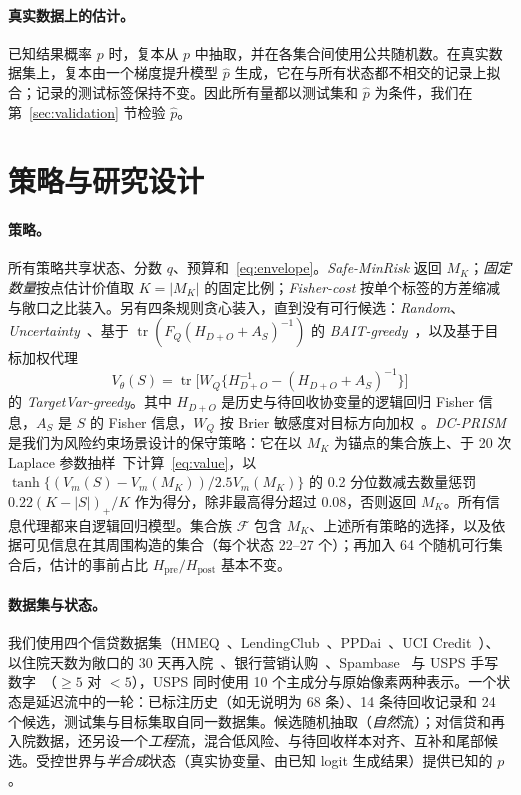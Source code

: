 \documentclass[runningheads]{llncs}
\newcommand{\Hpost}{H_{\mathrm{post}}}
\newcommand{\Hpre}{H_{\mathrm{pre}}}
\begin{document}
\paragraph{真实数据上的估计。}已知结果概率 $p$ 时，复本从 $p$ 中抽取，并在各集合间使用公共随机数。在真实数据集上，复本由一个梯度提升模型 $\hat p$ 生成，它在与所有状态都不相交的记录上拟合；记录的测试标签保持不变。因此所有量都以测试集和 $\hat p$ 为条件，我们在第~\ref{sec:validation} 节检验 $\hat p$。

\section{策略与研究设计}
\label{sec:policy}
\paragraph{策略。}所有策略共享状态、分数 $q$、预算和~\eqref{eq:envelope}。\emph{Safe-MinRisk} 返回 $M_K$；\emph{固定数量}按点估计价值取 $K=|M_K|$ 的固定比例；\emph{Fisher-cost} 按单个标签的方差缩减与敞口之比装入。另有四条规则贪心装入，直到没有可行候选：\emph{Random}、\emph{Uncertainty}~\cite{lewis1994sequential}、基于 $\operatorname{tr}(F_Q(H_{D+O}+A_S)^{-1})$ 的 \emph{BAIT-greedy}~\cite{ash2021fishing}，以及基于目标加权代理
\begin{equation}
 V_\theta(S)=\operatorname{tr}\big[W_Q\{H_{D+O}^{-1}-(H_{D+O}+A_S)^{-1}\}\big]\label{eq:value}
\end{equation}
的 \emph{TargetVar-greedy}。其中 $H_{D+O}$ 是历史与待回收协变量的逻辑回归 Fisher 信息，$A_S$ 是 $S$ 的 Fisher 信息，$W_Q$ 按 Brier 敏感度对目标方向加权~\cite{yu2006transductive,bickfordsmith2023prediction}。\emph{DC-PRISM} 是我们为风险约束场景设计的保守策略：它在以 $M_K$ 为锚点的集合族上、于 20 次 Laplace 参数抽样~\cite{mackay1992practical}下计算~\eqref{eq:value}，以 $\tanh\{(V_m(S)-V_m(M_K))/2.5V_m(M_K)\}$ 的 0.2 分位数减去数量惩罚 $0.22(K-|S|)_+/K$ 作为得分，除非最高得分超过 $0.08$，否则返回 $M_K$。所有信息代理都来自逻辑回归模型。集合族 $\mathcal F$ 包含 $M_K$、上述所有策略的选择，以及依据可见信息在其周围构造的集合（每个状态 22--27 个）；再加入 64 个随机可行集合后，估计的事前占比 $\Hpre/\Hpost$ 基本不变。

\paragraph{数据集与状态。}我们使用四个信贷数据集（HMEQ~\cite{sasHMEQ}、LendingClub~\cite{lendingclubSource}、PPDai~\cite{ppdaiSource,he2018ensemble}、UCI Credit~\cite{yeh2009comparison}）、以住院天数为敞口的 30 天再入院~\cite{strack2014impact}、银行营销认购~\cite{moro2014bank}、Spambase~\cite{hopkins1999spambase} 与 USPS 手写数字~\cite{hull1994usps}（$\ge5$ 对 $<5$），USPS 同时使用 10 个主成分与原始像素两种表示。一个状态是延迟流中的一轮：已标注历史（如无说明为 68 条）、14 条待回收记录和 24 个候选，测试集与目标集取自同一数据集。候选随机抽取（\emph{自然}流）；对信贷和再入院数据，还另设一个\emph{工程}流，混合低风险、与待回收样本对齐、互补和尾部候选。受控世界与\emph{半合成}状态（真实协变量、由已知 logit 生成结果）提供已知的 $p$。
\end{document}
